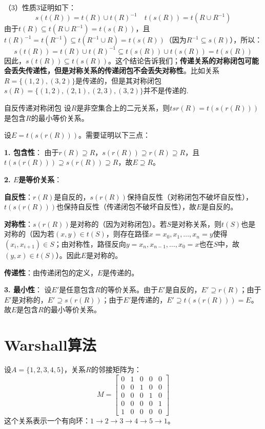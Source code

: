 （3）性质3证明如下：
\[s(t(R)) = t(R) \cup t(R)^{-1} \quad
t(s(R)) = t(R \cup R^{-1}) \]
由于$t(R) \subseteq t(R \cup R^{-1}) = t(s(R))$，且$t(R)^{-1} = t(R^{-1}) \subseteq t(R^{-1} \cup R) = t(s(R))$（因为$R^{-1} \subseteq s(R)$），所以：
\[
s(t(R)) = t(R) \cup t(R)^{-1} \subseteq t(s(R)) \cup t(s(R)) = t(s(R))
\]
因此，$s(t(R)) \subseteq t(s(R))$。这个结论告诉我们；\textbf{传递关系的对称闭包可能会丢失传递性，但是对称关系的传递闭包不会丢失对称性}。比如关系$R=\{(1,2),(3,2)\}$是传递的，但是其对称闭包$s(R)=\{(1,2),(2,1),(2,3),(3,2)\}$并不是传递的.
\begin{theorem}{自反传递对称闭包}{}
    设$R$是非空集合上的二元关系，则$tsr(R)=t(s(r(R)))$是包含$R$的最小等价关系。
\end{theorem}
设$E = t(s(r(R)))$。需要证明以下三点：

\textbf{1. 包含性}：
由于$r(R) \supseteq R$，$s(r(R)) \supseteq r(R) \supseteq R$，且$t(s(r(R))) \supseteq s(r(R)) \supseteq R$，故$E \supseteq R$。

\textbf{2. $E$是等价关系}：

\textbf{自反性}：$r(R)$是自反的，$s(r(R))$保持自反性（对称闭包不破坏自反性），$t(s(r(R)))$也保持自反性（传递闭包不破坏自反性），故$E$是自反的。

\textbf{对称性}：$s(r(R))$是对称的（因为对称闭包）。若$S$是对称关系，则$t(S)$也是对称的（因为若$(x,y) \in t(S)$，则存在路径$x=x_0,x_1,\ldots,x_n=y$使得$(x_i,x_{i+1}) \in S$；由对称性，路径反向$y=x_n,x_{n-1},\ldots,x_0=x$也在$S$中，故$(y,x) \in t(S)$）。因此$E$是对称的。

\textbf{传递性}：由传递闭包的定义，$E$是传递的。

\textbf{3. 最小性}：
设$E'$是任意包含$R$的等价关系。由于$E'$是自反的，$E' \supseteq r(R)$；由于$E'$是对称的，$E' \supseteq s(r(R))$；由于$E'$是传递的，$E' \supseteq t(s(r(R))) = E$。故$E$是包含$R$的最小等价关系。
\section{Warshall算法}
设$A = \{1,2,3,4,5\}$，关系$R$的邻接矩阵为：
\[
M = \begin{bmatrix}
0 & 1 & 0 & 0 & 0 \\
0 & 0 & 1 & 0 & 0 \\
0 & 0 & 0 & 1 & 0 \\
0 & 0 & 0 & 0 & 1 \\
1 & 0 & 0 & 0 & 0
\end{bmatrix}
\]
这个关系表示一个有向环：$1 \to 2 \to 3 \to 4 \to 5 \to 1$。

